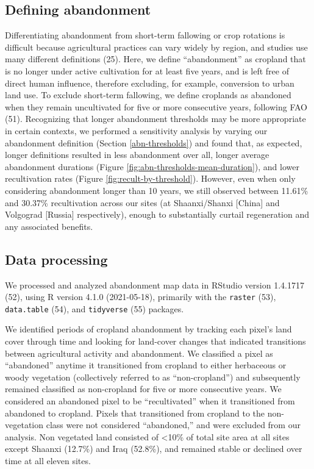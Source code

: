 \documentclass[9pt,twocolumn,twoside,lineno]{pnas-new}
\begin{document}
\hypertarget{defining-abandonment}{%
\subsection{Defining abandonment}\label{defining-abandonment}}

Differentiating abandonment from short-term fallowing or crop rotations is difficult because agricultural practices can vary widely by region, and studies use many different definitions (25).
Here, we define ``abandonment'' as cropland that is no longer under active cultivation for at least five years, and is left free of direct human influence, therefore excluding, for example, conversion to urban land use.
To exclude short-term fallowing, we define croplands as abandoned when they remain uncultivated for five or more consecutive years, following FAO (51).
Recognizing that longer abandonment thresholds may be more appropriate in certain contexts, we performed a sensitivity analysis by varying our abandonment definition (Section \ref{abn-thresholds}) and found that, as expected, longer definitions resulted in less abandonment over all, longer average abandonment durations (Figure \ref{fig:abn-thresholds-mean-duration}), and lower recultivation rates (Figure \ref{fig:recult-by-threshold}).
However, even when only considering abandonment longer than 10 years, we still observed between 11.61\% and 30.37\% recultivation across our sites (at Shaanxi/Shanxi {[}China{]} and Volgograd {[}Russia{]} respectively), enough to substantially curtail regeneration and any associated benefits.

\hypertarget{data-processing}{%
\subsection{Data processing}\label{data-processing}}

We processed and analyzed abandonment map data in RStudio version 1.4.1717 (52), using R version 4.1.0 (2021-05-18), primarily with the \texttt{raster} (53), \texttt{data.table} (54), and \texttt{tidyverse} (55) packages.

We identified periods of cropland abandonment by tracking each pixel's land cover through time and looking for land-cover changes that indicated transitions between agricultural activity and abandonment.
We classified a pixel as ``abandoned'' anytime it transitioned from cropland to either herbaceous or woody vegetation (collectively referred to as ``non-cropland'') and subsequently remained classified as non-cropland for five or more consecutive years.
We considered an abandoned pixel to be ``recultivated'' when it transitioned from abandoned to cropland.
Pixels that transitioned from cropland to the non-vegetation class were not considered ``abandoned,'' and were excluded from our analysis.
Non vegetated land consisted of \textless10\% of total site area at all sites except Shaanxi (12.7\%) and Iraq (52.8\%), and remained stable or declined over time at all eleven sites.
\end{document}

